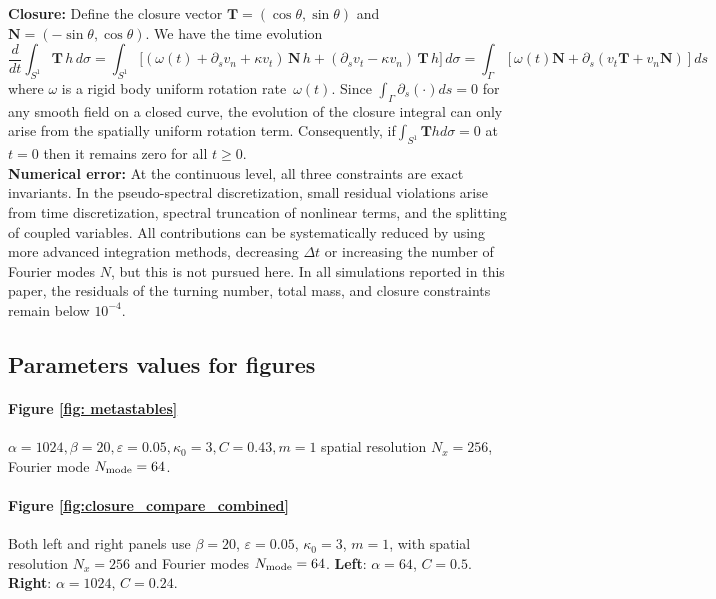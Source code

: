 \documentclass[
aip,
jcp,
reprint, 
floatfix
]{revtex4-1}
\begin{document}
{\bf Closure:}\label{sec:closure_cons}
Define the closure vector $\mathbf{T}=(\cos\theta,\sin\theta)$ and $\mathbf{N}=(-\sin\theta,\cos\theta)$.  We have the time evolution
\begin{equation}
\frac{d}{dt}\int_{S^1}\mathbf{T}\,h\,d\sigma
=\int_{S^1}\bigl[(\omega(t)+\partial_s v_n+\kappa v_t)\,\mathbf{N}\,h
+(\partial_s v_t-\kappa v_n)\,\mathbf{T}\,h\bigr]\,d\sigma
=\int_{\Gamma}\left[\omega(t) \mathbf{N}+\partial_s\left(v_t \mathbf{T}+v_n \mathbf{N}\right)\right] d s
\label{eq:dXdt_raw}
\end{equation}
where $\omega$ is a rigid body uniform rotation rate~$\omega(t)$.  Since $
\int_{\Gamma} \partial_s(\cdot) d s=0
$
for any smooth field on a closed curve, the evolution of the closure integral can only arise from the spatially uniform rotation term. Consequently, if$
\int_{S^1} \mathbf{T} h d \sigma=0$ at $ t=0
$ then it remains zero for all $t \geq 0$.\\

{\bf Numerical error:}
At the continuous level, all three constraints are exact invariants. In the pseudo-spectral discretization, small residual violations arise from time discretization, spectral truncation of nonlinear terms, and the splitting of coupled variables. All contributions can be systematically reduced by using more advanced integration methods, decreasing $\Delta t$ or increasing the number of Fourier modes $N$, but this is not pursued here. In all simulations reported in this paper, the residuals of the turning number, total mass, and closure constraints remain below $10^{-4}$.

\subsection{Parameters values for figures}

\paragraph{Figure \ref{fig: metastables}}
$\alpha=1024, \beta=20, \varepsilon=0.05, \kappa_0=3, C=0.43, m=1$
spatial resolution $N_x = 256$, Fourier mode $N_{\rm mode}=64$.

\paragraph{Figure \ref{fig:closure_compare_combined}}
Both left and right panels use $\beta=20$, $\varepsilon=0.05$, $\kappa_0=3$, $m=1$, with spatial resolution $N_x=256$ and Fourier modes $N_{\rm mode}=64$.
\textbf{Left}: $\alpha=64$, $C=0.5$.
\textbf{Right}: $\alpha=1024$, $C=0.24$.
\end{document}
